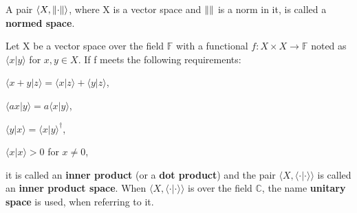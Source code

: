 \begin{definition}
A pair $\langle X, \left\lVert\cdot\right\rVert \rangle$, where X is a vector space and $\left\lVert\right\rVert$ is a norm in it, is called a \textbf{normed space}.
\end{definition}

\begin{definition}
Let X be a vector space over the field $\mathbb{F}$ with a functional $f: X \times X \rightarrow \mathbb{F}$ noted as $\langle x | y \rangle$ for $x,y \in X$. If f meets the following requirements:
\begin{legal}
    \item $\langle x + y | z\rangle = \langle x | z \rangle + \langle y | z \rangle$,
    \item $\langle ax | y \rangle = a\langle x | y \rangle$,
    \item $\langle y | x\rangle = \langle x | y \rangle^\dagger$,
    \item $\langle x | x \rangle > 0$ for $x \neq 0$,
\end{legal}
it is called an \textbf{inner product} (or a \textbf{dot product}) and the pair $\langle X, \langle\cdot | \cdot\rangle \rangle$ is called an \textbf{inner product space}. When $\langle X, \langle\cdot | \cdot\rangle \rangle$ is over the field $\mathbb{C}$, the name \textbf{unitary space} is used, when referring to it.
\end{definition}

